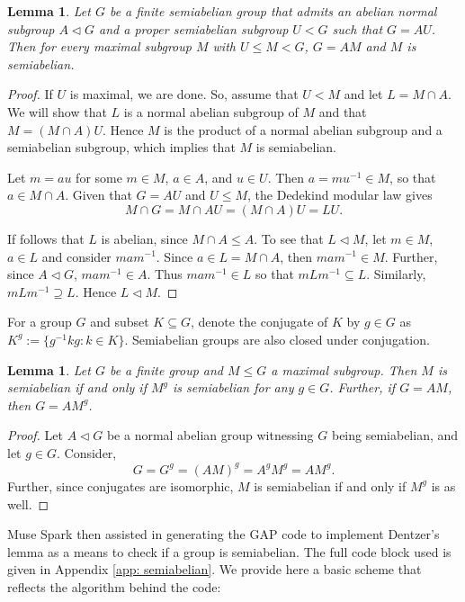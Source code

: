 \documentclass[11pt]{article}
\newtheorem{lem}[thm]{Lemma}
\theoremstyle{definition}
\numberwithin{equation}{section}
\begin{document}
\begin{aiblock}

\begin{lem}\label{lem: semiabelian-pullback}
    Let $G$ be a finite semiabelian group that admits an abelian normal subgroup $A \lhd G$ and a proper semiabelian subgroup $U < G$ such that $G = AU$. Then for every maximal subgroup $M$ with $U \leq M < G$, $G =AM$ and $M$ is semiabelian. 
\end{lem}

\begin{proof}
    If $U$ is maximal, we are done. So, assume that $U < M$ and let $L = M \cap A$. We will show that $L$ is a normal abelian subgroup of $M$ and that $M = (M \cap A) U$. Hence $M$ is the product of a normal abelian subgroup and a semiabelian subgroup, which implies that $M$ is semiabelian. 

    Let $m = au$ for some $m \in M$, $a \in A$, and $u \in U$. Then $a = m u^{-1} \in M$, so that $a \in M \cap A$. Given that $G = AU$ and $U \leq M$, the Dedekind modular law gives
    \[  M \cap G = M \cap AU = (M \cap A) U = LU. \]

    If follows that $L$ is abelian, since $M \cap A \leq A$. To see that $L \lhd M$, let $m \in M$, $a\in L$ and consider $mam^{-1}$. Since $a \in L = M \cap A$, then $m a m^{-1} \in M$. Further, since $A \lhd G$, $m a m^{-1} \in A$. Thus $mam^{-1} \in L$ so that $mLm^{-1} \subseteq L$. Similarly, $mLm^{-1} \supseteq L$. Hence $L \lhd M$. 
\end{proof}

For a group $G$ and subset $K \subseteq G$, denote the conjugate of $K$ by $g \in G$ as $K^g := \{  g^{-1} k g : k \in K \}$. Semiabelian groups are also closed under conjugation. 

\begin{lem}
    Let $G$ be a finite group and $M \leq G$ a maximal subgroup. Then $M$ is semiabelian if and only if $M^g$ is semiabelian for any $g \in G$. Further, if $G = AM$, then $G = AM^g$.  
\end{lem}


\begin{proof}
    Let $A \lhd G$ be a normal abelian group witnessing $G$ being semiabelian, and let $g \in G$. Consider,  
\[
        G = G^g = (AM)^g = A^g M^g = A M^g.
\]
    Further, since conjugates are isomorphic, $M$ is semiabelian if and only if $M^g$ is as well. 
\end{proof}
\end{aiblock}
\begin{humanblock} 

    Muse Spark then assisted in generating the {\ttfamily \large GAP} code to implement Dentzer's lemma as a means to check if a group is semiabelian. The full code block used is given in Appendix \ref{app: semiabelian}. We provide here a basic scheme that reflects the algorithm behind the code: 

    \end{humanblock}
\vspace{.25cm}%
\begin{aiblock}

\end{aiblock}
\end{document}
